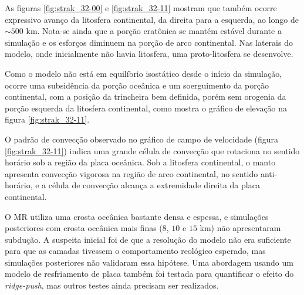 As figuras \ref{fig:strak_32-00} e \ref{fig:strak_32-11} mostram que também ocorre expressivo avanço da litosfera continental, da direita para a esquerda, ao longo de $\sim500$ km. Nota-se ainda que a porção cratônica se mantém estável durante a simulação e os esforços diminuem na porção de arco continental. Nas laterais do modelo, onde inicialmente não havia litosfera, uma proto-litosfera se desenvolve.

Como o modelo não está em equilíbrio isostático desde o início da simulação, ocorre uma subsidência da porção oceânica e um soerguimento da porção continental, com a posição da trincheira bem definida, porém sem orogenia da porção esquerda da litosfera continental, como mostra o gráfico de elevação na figura \ref{fig:strak_32-11}.

O padrão de convecção observado no gráfico de campo de velocidade (figura \ref{fig:strak_32-11}) indica uma grande célula de convecção que rotaciona no sentido horário sob a região da placa oceânica. Sob a litosfera continental, o manto apresenta convecção vigorosa na região de arco continental, no sentido anti-horário, e a célula de convecção alcança a extremidade direita da placa continental.

O MR utiliza uma crosta oceânica bastante densa e espessa, e simulações posteriores com crosta oceânica mais finas ($8$, $10$ e $15$ km) não apresentaram subdução. A suspeita inicial foi de que a resolução do modelo não era suficiente para que as camadas tivessem o comportamento reológico esperado, mas simulações posteriores não validaram essa hipótese. Uma abordagem usando um modelo de resfriamento de placa \citep{turcotte2002geodynamics} também foi testada para quantificar o efeito do \textit{ridge-push}, mas outros testes ainda precisam ser realizados.



